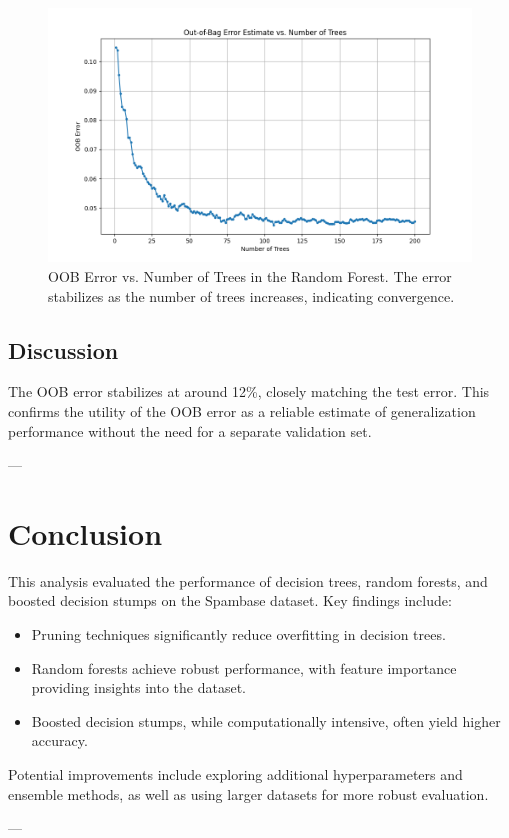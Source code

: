 \documentclass[12pt]{article}
\begin{document}
\begin{figure}[h!]
    \centering
    \includegraphics[width=0.8\linewidth]{figures/OOB_error.png}
    \caption{OOB Error vs. Number of Trees in the Random Forest. The error stabilizes as the number of trees increases, indicating convergence.}
    \label{fig:oob_error}
\end{figure}

\subsection*{Discussion}
The OOB error stabilizes at around 12\%, closely matching the test error. This confirms the utility of the OOB error as a reliable estimate of generalization performance without the need for a separate validation set.

---

\section{Conclusion}
This analysis evaluated the performance of decision trees, random forests, and boosted decision stumps on the Spambase dataset. Key findings include:
\begin{itemize}
    \item Pruning techniques significantly reduce overfitting in decision trees.
    \item Random forests achieve robust performance, with feature importance providing insights into the dataset.
    \item Boosted decision stumps, while computationally intensive, often yield higher accuracy.
\end{itemize}
Potential improvements include exploring additional hyperparameters and ensemble methods, as well as using larger datasets for more robust evaluation.

---
\end{document}
